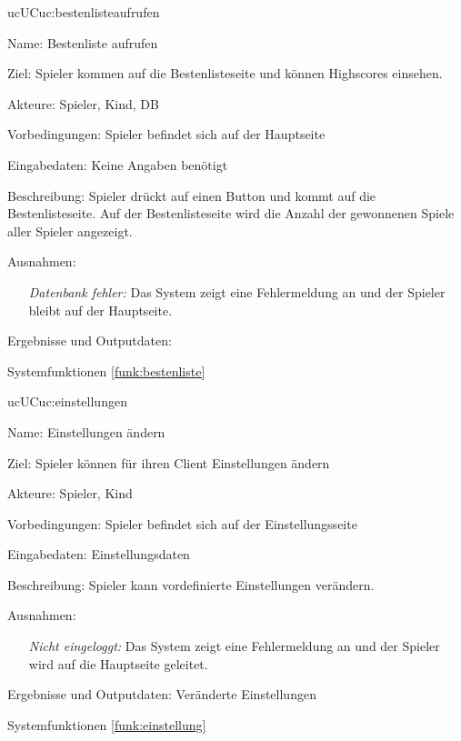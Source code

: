 \begin{description}[leftmargin=5em, style=sameline]
	\begin{lhp}{uc}{UC}{uc:bestenlisteaufrufen}
		\item [Name:] Bestenliste aufrufen
		\item [Ziel:] Spieler kommen auf die Bestenlisteseite und können Highscores einsehen.
		\item [Akteure:] Spieler, Kind, DB
		\item [Vorbedingungen:] Spieler befindet sich auf der Hauptseite
		\item [Eingabedaten:] Keine Angaben benötigt
		\item [Beschreibung:] Spieler drückt auf einen Button und kommt auf die Bestenlisteseite. Auf der Bestenlisteseite wird die Anzahl der gewonnenen Spiele aller Spieler angezeigt.
		\item [Ausnahmen:] \begin{itemize}
						\item[] \textit{Datenbank fehler:} Das System zeigt eine Fehlermeldung an und der Spieler bleibt auf der Hauptseite.
						
					\end{itemize}
		\item [Ergebnisse und Outputdaten:]
		\item [Systemfunktionen] \ref{funk:bestenliste}
	\end{lhp}

	\begin{lhp}{uc}{UC}{uc:einstellungen}
		\item [Name:] Einstellungen ändern
		\item [Ziel:] Spieler können für ihren Client Einstellungen ändern
		\item [Akteure:] Spieler, Kind
		\item [Vorbedingungen:] Spieler befindet sich auf der Einstellungsseite
		\item [Eingabedaten:] Einstellungsdaten
		\item [Beschreibung:] Spieler kann vordefinierte Einstellungen verändern.
		\item [Ausnahmen:] \begin{itemize}
						\item[] \textit{Nicht eingeloggt:} Das System zeigt eine Fehlermeldung an und der Spieler wird auf die Hauptseite geleitet.
					\end{itemize}
		\item [Ergebnisse und Outputdaten:] Veränderte Einstellungen
		\item [Systemfunktionen] \ref{funk:einstellung}
	\end{lhp}


\end{description}
